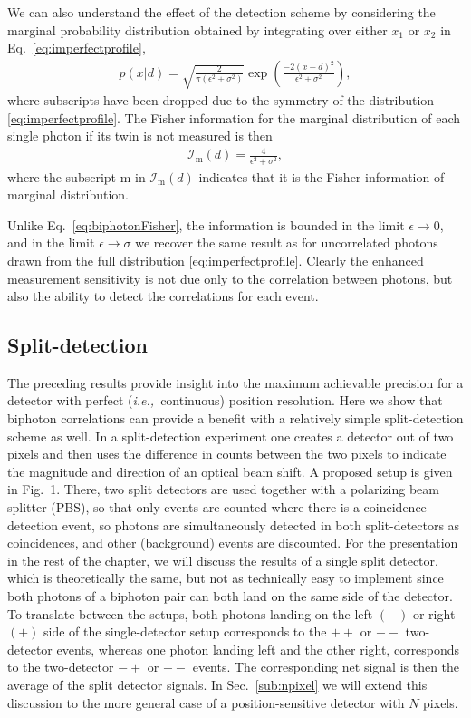 We can also understand the effect of the detection scheme by considering the marginal probability distribution obtained by integrating over either $x_1$ or $x_2$ in Eq.~\eqref{eq:imperfectprofile},
\begin{align}
	p(x|d) = \sqrt{\frac{2}{\pi(\epsilon^2 + \sigma^2)}} \exp\left(\frac{-2(x-d)^2}{\epsilon^2 + \sigma^2} \right),
\end{align}
where subscripts have been dropped due to the symmetry of the distribution \eqref{eq:imperfectprofile}.
The Fisher information for the marginal distribution of each single photon if its twin is not measured is then 
\begin{align}\label{eq:margfisher}
	\mathcal{I}_\textrm{m}(d) = \frac{4}{\epsilon^2 + \sigma^2},
\end{align}
where the subscript m in $\mathcal{I}_\textrm{m}(d)$ indicates that it is the Fisher information of marginal distribution. 

Unlike Eq.~\eqref{eq:biphotonFisher}, the information is bounded in the limit $\epsilon \rightarrow 0$, and in the limit $\epsilon \rightarrow \sigma$ we recover the same result as for uncorrelated photons drawn from the full distribution \eqref{eq:imperfectprofile}.
Clearly the enhanced measurement sensitivity is not due only to the correlation between photons, but also the ability to detect the correlations for each event.

\subsection{Split-detection}\label{sub:split-detection}

The preceding results provide insight into the maximum achievable precision for a detector with perfect (\emph{i.e.,}~continuous) position resolution.  
Here we show that biphoton correlations can provide a benefit with a relatively simple split-detection scheme as well.  In a split-detection experiment one creates a detector out of two pixels and then uses the difference in counts between the two pixels to indicate the magnitude and direction of an optical beam shift.  A proposed setup is given in Fig.~1.  There, two split detectors are used together with a polarizing beam splitter (PBS), so that only events are counted where there is a coincidence detection event, so photons are simultaneously detected in both split-detectors as coincidences, and other (background) events are discounted.  For the presentation in the rest of the chapter, we will discuss the results of a single split detector, which is theoretically the same, but not as technically easy to implement since both photons of a biphoton pair can both land on the same side of the detector.  To translate between the setups, both photons landing on the left $(-)$ or right $(+)$ side of the single-detector setup corresponds to the $++$ or $--$ two-detector events, whereas one photon landing left and the other right, corresponds to the two-detector $-+$ or $+-$ events.  The corresponding net signal is then the average of the split detector signals.  In Sec.~\ref{sub:npixel} we will extend this discussion to the more general case of a position-sensitive detector with $N$ pixels.

